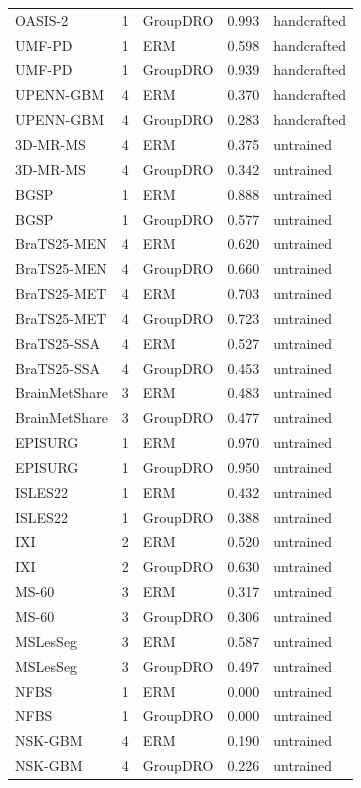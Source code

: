 \begin{tabular}{lrlrl}
OASIS-2 & 1 & GroupDRO & 0.993 & handcrafted \\
UMF-PD & 1 & ERM & 0.598 & handcrafted \\
UMF-PD & 1 & GroupDRO & 0.939 & handcrafted \\
UPENN-GBM & 4 & ERM & 0.370 & handcrafted \\
UPENN-GBM & 4 & GroupDRO & 0.283 & handcrafted \\
3D-MR-MS & 4 & ERM & 0.375 & untrained \\
3D-MR-MS & 4 & GroupDRO & 0.342 & untrained \\
BGSP & 1 & ERM & 0.888 & untrained \\
BGSP & 1 & GroupDRO & 0.577 & untrained \\
BraTS25-MEN & 4 & ERM & 0.620 & untrained \\
BraTS25-MEN & 4 & GroupDRO & 0.660 & untrained \\
BraTS25-MET & 4 & ERM & 0.703 & untrained \\
BraTS25-MET & 4 & GroupDRO & 0.723 & untrained \\
BraTS25-SSA & 4 & ERM & 0.527 & untrained \\
BraTS25-SSA & 4 & GroupDRO & 0.453 & untrained \\
BrainMetShare & 3 & ERM & 0.483 & untrained \\
BrainMetShare & 3 & GroupDRO & 0.477 & untrained \\
EPISURG & 1 & ERM & 0.970 & untrained \\
EPISURG & 1 & GroupDRO & 0.950 & untrained \\
ISLES22 & 1 & ERM & 0.432 & untrained \\
ISLES22 & 1 & GroupDRO & 0.388 & untrained \\
IXI & 2 & ERM & 0.520 & untrained \\
IXI & 2 & GroupDRO & 0.630 & untrained \\
MS-60 & 3 & ERM & 0.317 & untrained \\
MS-60 & 3 & GroupDRO & 0.306 & untrained \\
MSLesSeg & 3 & ERM & 0.587 & untrained \\
MSLesSeg & 3 & GroupDRO & 0.497 & untrained \\
NFBS & 1 & ERM & 0.000 & untrained \\
NFBS & 1 & GroupDRO & 0.000 & untrained \\
NSK-GBM & 4 & ERM & 0.190 & untrained \\
NSK-GBM & 4 & GroupDRO & 0.226 & untrained \\

\end{tabular}
